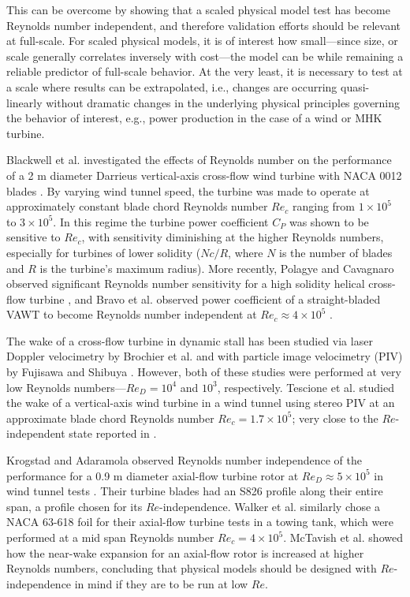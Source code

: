 \documentclass[energies,article,accept,moreauthors,pdftex,12pt,a4paper]{mdpi}
\begin{document}
This can be overcome by showing that a scaled physical model test has become
Reynolds number independent, and therefore validation efforts should be relevant
at full-scale.  For scaled physical models, it is of interest how small---since
size, or scale generally correlates inversely with cost---the model can be while
remaining a reliable predictor of full-scale behavior. At the very least, it is
necessary to test at a scale where results can be extrapolated, i.e., changes
are occurring quasi-linearly without dramatic changes in the underlying physical
principles governing the behavior of interest, e.g., power production in the
case of a wind or MHK turbine.

Blackwell et al. investigated the effects of Reynolds number on the performance
of a 2 m diameter Darrieus vertical-axis cross-flow wind turbine with NACA 0012
blades \cite{Blackwell1976}. By varying wind tunnel speed, the turbine was made
to operate at approximately constant blade chord Reynolds number $Re_c$ ranging
from $1 \times 10^5$ to $3 \times 10^5$. In this regime the turbine power
coefficient $C_P$ was shown to be sensitive to $Re_c$, with sensitivity
diminishing at the higher Reynolds numbers, especially for turbines of lower
solidity ($Nc/R$, where $N$ is the number of blades and $R$ is the turbine's
maximum radius). More recently, Polagye and Cavagnaro observed significant
Reynolds number sensitivity for a high solidity helical cross-flow turbine
\cite{Polagye2013b}, and Bravo et al. observed power coefficient of a
straight-bladed VAWT to become Reynolds number independent at $Re_c \approx 4
\times 10^5$ \cite{Bravo2007}.

The wake of a cross-flow turbine in dynamic stall has been studied via laser
Doppler velocimetry by Brochier et al. \cite{Brochier1986} and with particle
image velocimetry (PIV) by Fujisawa and Shibuya \cite{Fujisawa2001}. However,
both of these studies were performed at very low Reynolds numbers---$Re_D =
10^4$ and $10^3$, respectively. Tescione et al. \cite{Tescione2014} studied the
wake of a vertical-axis wind turbine in a wind tunnel using stereo PIV at an
approximate blade chord Reynolds number $Re_c = 1.7 \times 10^5$; very close to
the $Re$-independent state reported in \cite{Bachant2014}.

Krogstad and Adaramola observed Reynolds number independence of the performance
for a 0.9 m diameter axial-flow turbine rotor at $Re_D \approx 5 \times 10^5$ in
wind tunnel tests \cite{Krogstad2012a}. Their turbine blades had an S826 profile
along their entire span, a profile chosen for its $Re$-independence. Walker et
al. \cite{Walker2014} similarly chose a NACA 63-618 foil for their axial-flow
turbine tests in a towing tank, which were performed at a mid span Reynolds
number $Re_c = 4 \times 10^5$. McTavish et al. \cite{McTavish2013} showed how
the near-wake expansion for an axial-flow rotor is increased at higher Reynolds
numbers, concluding that physical models should be designed with
$Re$-independence in mind if they are to be run at low $Re$.
\end{document}
